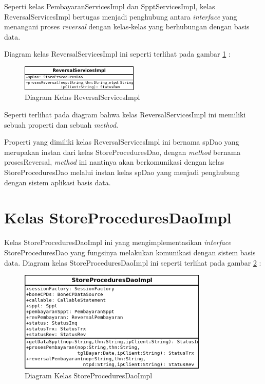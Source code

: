Seperti kelas PembayaranServicesImpl dan SpptServicesImpl, kelas ReversalServicesImpl bertugas menjadi penghubung antara \textit{interface} yang menangani proses \textit{reversal} dengan kelas-kelas yang berhubungan dengan basis data. 

Diagram kelas ReversalServicesImpl ini seperti terlihat pada gambar \ref{fig:uml-class-ReversalServicesImpl} :

\begin{figure}[H]
  \centering
  \includegraphics[width=0.5\textwidth]{./resources/uml/uml-class-ReversalServicesImpl}
  \caption{Diagram Kelas ReversalServicesImpl}
  \label{fig:uml-class-ReversalServicesImpl}
\end{figure}

Seperti terlihat pada diagram bahwa kelas ReversalServicesImpl ini memiliki sebuah properti dan sebuah \textit{method}.

Properti yang dimiliki kelas ReversalServicesImpl ini bernama spDao yang merupakan instan dari kelas StoreProceduresDao, dengan \textit{method} bernama prosesReversal, \textit{method} ini nantinya akan berkomunikasi dengan kelas StoreProceduresDao melalui instan kelas spDao yang menjadi penghubung dengan sistem aplikasi basis data.

\section{Kelas StoreProceduresDaoImpl}

Kelas StoreProceduresDaoImpl ini yang mengimplementasikan \textit{interface} StoreProceduresDao yang fungsinya melakukan komunikasi dengan sistem basis data. Diagram kelas StoreProceduresDaoImpl ini seperti terlihat pada gambar \ref{fig:uml-class-StoreProceduresDaoImpl} :

\begin{figure}[H]
  \centering
  \includegraphics[width=0.8\textwidth]{./resources/uml/uml-class-StoreProceduresDaoImpl}
  \caption{Diagram Kelas StoreProceduresDaoImpl}
  \label{fig:uml-class-StoreProceduresDaoImpl}
\end{figure}


